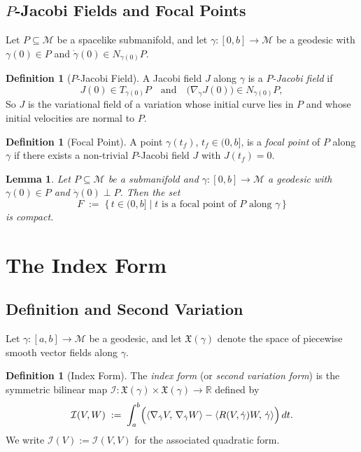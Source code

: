 \documentclass[12pt, a4paper]{article}
\theoremstyle{plain}
\newtheorem{lemma}[theorem]{Lemma}
\theoremstyle{definition}
\newtheorem{definition}[theorem]{Definition}
\theoremstyle{remark}
\newcommand{\M}{\mathcal{M}}
\newcommand{\Ind}{\mathcal{I}}
\newcommand{\ls}[2]{\langle #1,\, #2 \rangle}
\begin{document}
\subsection{$P$-Jacobi Fields and Focal Points}

Let $P \subseteq \M$ be a spacelike submanifold, and let
$\gamma \colon [0,b] \to \M$ be a geodesic with $\gamma(0) \in P$ and
$\dot{\gamma}(0) \in N_{\gamma(0)}P$.

\begin{definition}[$P$-Jacobi Field]
  A Jacobi field $J$ along $\gamma$ is a \emph{$P$-Jacobi field} if
  \[
    J(0) \in T_{\gamma(0)}P
    \quad\text{and}\quad
    \bigl(\nabla_{\dot{\gamma}} J(0)\bigr) \in N_{\gamma(0)}P,
  \]
  So $J$ is the variational field of a variation whose
  initial curve lies in $P$ and whose initial velocities are normal to $P$.
\end{definition}

\begin{definition}[Focal Point]
  A point $\gamma(t_f)$, $t_f \in (0, b]$, is a \emph{focal point} of $P$
  along $\gamma$ if there exists a non-trivial $P$-Jacobi field $J$ with
  $J(t_f) = 0$.
\end{definition}

\begin{lemma}
\label{lem:focal-compact}
  Let $P \subseteq \M$ be a submanifold and $\gamma \colon [0, b] \to \M$ a
  geodesic with $\gamma(0) \in P$ and $\dot{\gamma}(0) \perp P$. Then the set
  \[
    F \;:=\; \bigl\{\,t \in (0,b] \;\big|\; t \text{ is a focal point of } P
             \text{ along } \gamma\,\bigr\}
  \]
  is compact.
\end{lemma}


\section{The Index Form}

\subsection{Definition and Second Variation}

Let $\gamma \colon [a, b] \to \M$ be a geodesic, and let $\mathfrak{X}(\gamma)$ denote
the space of piecewise smooth vector fields along $\gamma$.

\begin{definition}[Index Form]
\label{def:index-form}
  The \emph{index form} (or \emph{second variation form}) is the
  symmetric bilinear map $\Ind \colon \mathfrak{X}(\gamma) \times
  \mathfrak{X}(\gamma) \to \mathbb{R}$ defined by
  \[
    \Ind(V, W) \;:=\;
    \int_a^b \Bigl(\ls{\nabla_{\dot{\gamma}} V}{\nabla_{\dot{\gamma}} W}
      - \ls{R(V,\dot{\gamma})W}{\dot{\gamma}}\Bigr)\,dt.
  \]
  We write $\Ind(V) := \Ind(V,V)$ for the associated quadratic form.
\end{definition}
\end{document}
